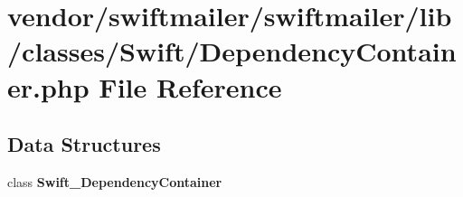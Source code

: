\section{vendor/swiftmailer/swiftmailer/lib/classes/\+Swift/\+Dependency\+Container.php File Reference}
\label{_dependency_container_8php}
\subsection*{Data Structures}
\begin{DoxyCompactItemize}
\item 
class {\bf Swift\+\_\+\+Dependency\+Container}
\end{DoxyCompactItemize}
